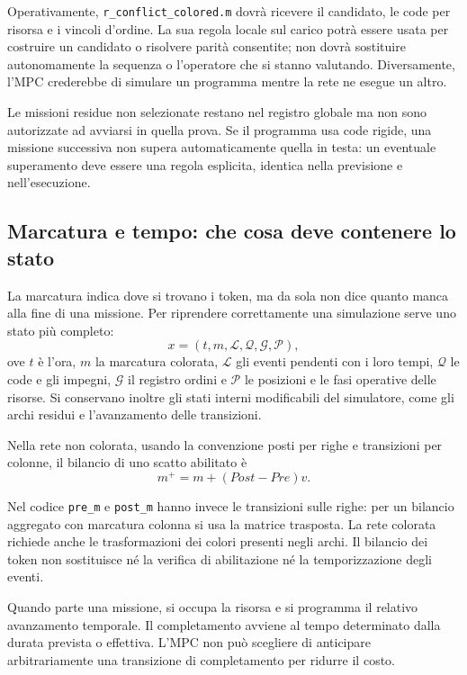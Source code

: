 \documentclass[a4paper,11pt]{article}
\begin{document}
Operativamente, \texttt{r\_conflict\_colored.m} dovrà ricevere il candidato, le code per risorsa e i vincoli d'ordine. La sua regola locale sul carico potrà essere usata per costruire un candidato o risolvere parità consentite; non dovrà sostituire autonomamente la sequenza o l'operatore che si stanno valutando. Diversamente, l'MPC crederebbe di simulare un programma mentre la rete ne esegue un altro.

Le missioni residue non selezionate restano nel registro globale ma non sono autorizzate ad avviarsi in quella prova. Se il programma usa code rigide, una missione successiva non supera automaticamente quella in testa: un eventuale superamento deve essere una regola esplicita, identica nella previsione e nell'esecuzione.

\subsection{Marcatura e tempo: che cosa deve contenere lo stato}

La marcatura indica dove si trovano i token, ma da sola non dice quanto manca alla fine di una missione. Per riprendere correttamente una simulazione serve uno stato più completo:
\begin{equation}
    x=(t,m,\mathcal{L},\mathcal{Q},\mathcal{G},\mathcal{P}),
\end{equation}
ove $t$ è l'ora, $m$ la marcatura colorata, $\mathcal{L}$ gli eventi pendenti con i loro tempi, $\mathcal{Q}$ le code e gli impegni, $\mathcal{G}$ il registro ordini e $\mathcal{P}$ le posizioni e le fasi operative delle risorse. Si conservano inoltre gli stati interni modificabili del simulatore, come gli archi residui e l'avanzamento delle transizioni.

Nella rete non colorata, usando la convenzione posti per righe e transizioni per colonne, il bilancio di uno scatto abilitato è
\begin{equation}
    m^+=m+(Post-Pre)v.
\end{equation}

Nel codice \texttt{pre\_m} e \texttt{post\_m} hanno invece le transizioni sulle righe: per un bilancio aggregato con marcatura colonna si usa la matrice trasposta. La rete colorata richiede anche le trasformazioni dei colori presenti negli archi. Il bilancio dei token non sostituisce né la verifica di abilitazione né la temporizzazione degli eventi.

Quando parte una missione, si occupa la risorsa e si programma il relativo avanzamento temporale. Il completamento avviene al tempo determinato dalla durata prevista o effettiva. L'MPC non può scegliere di anticipare arbitrariamente una transizione di completamento per ridurre il costo.
\end{document}
